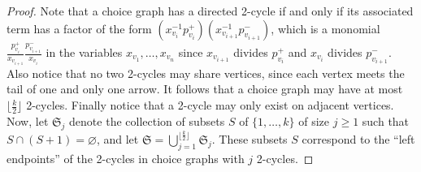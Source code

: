 \documentclass[ALCO,published]{cedram}
\numberwithin{equation}{section}
\renewcommand{\emptyset}{\varnothing}
\newcommand{\1}{^{-1}}
\begin{document}
\begin{proof}
 Note that a choice graph has a directed 2-cycle if and only if its associated term has a factor of the form $(x_{v_i}\1 p_{v_i}^+)(x_{v_{i+1}}\1 p_{v_{i+1}}^-)$, which is a monomial $\frac{p_{v_i}^+}{x_{v_{i+1}}} \frac{p_{v_{i+1}}^-}{x_{v_i}}$ in the variables $x_{v_1},\dots,x_{v_n}$ since $x_{v_{i+1}}$ divides $p_{v_i}^+$ and $x_{v_i}$ divides $p_{v_{i+1}}^-$.
Also notice that no two 2-cycles may share vertices, since each vertex
meets the tail of one and only one arrow. It follows that a choice
graph may have at most $\lfloor \frac k2 \rfloor$ 2-cycles. Finally
notice that a 2-cycle may only exist on adjacent vertices. Now, let
$\mathfrak S_j$ denote the collection of subsets $S$ of
$\{1,\dots,k\}$ of size $j\geq1$ such that $S \cap (S+1) = \emptyset$,
and let $\mathfrak S = \bigcup_{j=1}^{\lfloor \frac k2 \rfloor}
\mathfrak S_j$. These subsets $S$ correspond to the ``left endpoints''
of the 2-cycles in choice graphs with $j$ 2-cycles.

\pagebreak


\end{proof}
\end{document}
